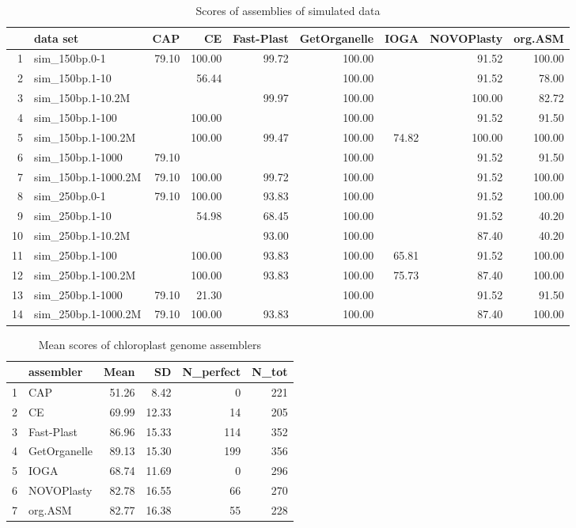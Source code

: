 \documentclass{bmcart}
\begin{document}
\begin{backmatter}
\begin{table}[ht]
\caption{Scores of assemblies of simulated data}
\label{tab:scores}
\centering
\begin{tabular}{rlrrrrrrr}
  \hline
 & data set & CAP & CE & Fast-Plast & GetOrganelle & IOGA & NOVOPlasty & org.ASM \\ 
  \hline
1 & sim\_150bp.0-1 & 79.10 & 100.00 & 99.72 & 100.00 &  & 91.52 & 100.00 \\ 
  2 & sim\_150bp.1-10 &  & 56.44 &  & 100.00 &  & 91.52 & 78.00 \\ 
  3 & sim\_150bp.1-10.2M &  &  & 99.97 & 100.00 &  & 100.00 & 82.72 \\ 
  4 & sim\_150bp.1-100 &  & 100.00 &  & 100.00 &  & 91.52 & 91.50 \\ 
  5 & sim\_150bp.1-100.2M &  & 100.00 & 99.47 & 100.00 & 74.82 & 100.00 & 100.00 \\ 
  6 & sim\_150bp.1-1000 & 79.10 &  &  & 100.00 &  & 91.52 & 91.50 \\ 
  7 & sim\_150bp.1-1000.2M & 79.10 & 100.00 & 99.72 & 100.00 &  & 91.52 & 100.00 \\ 
  8 & sim\_250bp.0-1 & 79.10 & 100.00 & 93.83 & 100.00 &  & 91.52 & 100.00 \\ 
  9 & sim\_250bp.1-10 &  & 54.98 & 68.45 & 100.00 &  & 91.52 & 40.20 \\ 
  10 & sim\_250bp.1-10.2M &  &  & 93.00 & 100.00 &  & 87.40 & 40.20 \\ 
  11 & sim\_250bp.1-100 &  & 100.00 & 93.83 & 100.00 & 65.81 & 91.52 & 100.00 \\ 
  12 & sim\_250bp.1-100.2M &  & 100.00 & 93.83 & 100.00 & 75.73 & 87.40 & 100.00 \\ 
  13 & sim\_250bp.1-1000 & 79.10 & 21.30 &  & 100.00 &  & 91.52 & 91.50 \\ 
  14 & sim\_250bp.1-1000.2M & 79.10 & 100.00 & 93.83 & 100.00 &  & 87.40 & 100.00 \\ 
   \hline
\end{tabular}
\end{table}


\begin{table}[ht]
\caption{Mean scores of chloroplast genome assemblers}
\label{tab:scores}
\centering
\begin{tabular}{rlrrrr}
  \hline
 & assembler & Mean & SD & N\_perfect & N\_tot \\ 
  \hline
  1 & CAP & 51.26 & 8.42 &   0 & 221 \\ 
  2 & CE & 69.99 & 12.33 &  14 & 205 \\ 
  3 & Fast-Plast & 86.96 & 15.33 & 114 & 352 \\ 
  4 & GetOrganelle & 89.13 & 15.30 & 199 & 356 \\ 
  5 & IOGA & 68.74 & 11.69 &   0 & 296 \\ 
  6 & NOVOPlasty & 82.78 & 16.55 &  66 & 270 \\ 
  7 & org.ASM & 82.77 & 16.38 &  55 & 228 \\ 
   \hline
\end{tabular}
\end{table}




\end{backmatter}
\end{document}
